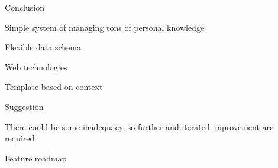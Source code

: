 \documentclass[10pt, compress]{beamer}
\begin{document}

\begin{frame}{Conclusion}

Simple system of managing tons of personal knowledge

Flexible data schema

Web technologies

Template based on context

\end{frame}


\begin{frame}{Suggestion}

There could be some inadequacy, so further and iterated improvement are required

Feature roadmap

\end{frame}



\end{document}
